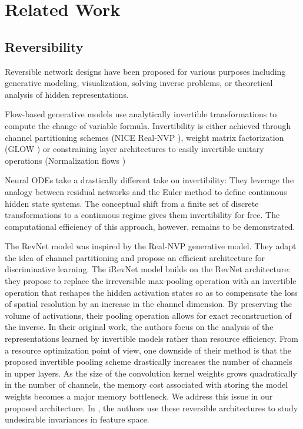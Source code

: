 \documentclass[twocolumn]{bmcart}
\begin{document}
\section{Related Work}
\subsection{Reversibility}

Reversible network designs have been proposed for various purposes including generative modeling, visualization, solving inverse problems, or theoretical analysis of hidden representations.

Flow-based generative models use analytically invertible transformations to compute the change of variable formula. Invertibility is either achieved through channel partitioning schemes (NICE \cite{dinh2014nice} Real-NVP \cite{dinh2016density}), weight matrix factorization (GLOW \cite{kingma2018glow}) or constraining layer architectures to easily invertible unitary operations (Normalization flows \cite{rezende2015variational})

Neural ODEs \cite{chen2018neural} take a drastically different take on invertibility: They leverage the analogy between residual networks and the Euler method to define continuous hidden state systems.
The conceptual shift from a finite set of discrete transformations to a continuous regime gives them invertibility for free. 
The computational efficiency of this approach, however, remains to be demonstrated.

The RevNet model \cite{gomez2017reversible} was inspired by the Real-NVP generative model. They adapt the idea of channel partitioning and propose an efficient architecture for discriminative learning.
The iRevNet \cite{jacobsen2018revnet} model builds on the RevNet architecture: they propose to replace the irreversible max-pooling operation with an invertible operation that reshapes the hidden activation states
so as to compensate the loss of spatial resolution by an increase in the channel dimension.
By preserving the volume of activations, their pooling operation allows for exact reconstruction of the inverse.
In their original work, the authors focus on the analysis of the representations learned by invertible models rather than resource efficiency.
From a resource optimization point of view, one downside of their method is that the proposed invertible pooling scheme drastically increases the number of channels in upper layers.
As the size of the convolution kernel weights grows quadratically in the number of channels, the memory cost associated with storing the model weights becomes a major memory bottleneck.
We address this issue in our proposed architecture.
In \cite{jacobsen2018excessive}, the authors use these reversible architectures to study undesirable invariances in feature space.
\end{document}
